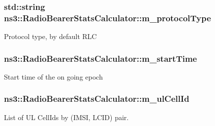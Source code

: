 \subsubsection[{\texorpdfstring{m\+\_\+protocol\+Type}{m_protocolType}}]{\setlength{\rightskip}{0pt plus 5cm}std\+::string ns3\+::\+Radio\+Bearer\+Stats\+Calculator\+::m\+\_\+protocol\+Type\hspace{0.3cm}{\ttfamily [private]}}\hypertarget{classns3_1_1RadioBearerStatsCalculator_a04e3362d2cfc3b03fa417696a45f58e3}{}\label{classns3_1_1RadioBearerStatsCalculator_a04e3362d2cfc3b03fa417696a45f58e3}
Protocol type, by default R\+LC 
\subsubsection[{\texorpdfstring{m\+\_\+start\+Time}{m_startTime}}]{ ns3\+::\+Radio\+Bearer\+Stats\+Calculator\+::m\+\_\+start\+Time\hspace{0.3cm}{\ttfamily [private]}}\hypertarget{classns3_1_1RadioBearerStatsCalculator_a421041c2860801f4b5f9aa55869755c6}{}\label{classns3_1_1RadioBearerStatsCalculator_a421041c2860801f4b5f9aa55869755c6}
Start time of the on going epoch 
\subsubsection[{\texorpdfstring{m\+\_\+ul\+Cell\+Id}{m_ulCellId}}]{ ns3\+::\+Radio\+Bearer\+Stats\+Calculator\+::m\+\_\+ul\+Cell\+Id\hspace{0.3cm}{\ttfamily [private]}}\hypertarget{classns3_1_1RadioBearerStatsCalculator_ada3352c06cc37fb640ae3106313d42f8}{}\label{classns3_1_1RadioBearerStatsCalculator_ada3352c06cc37fb640ae3106313d42f8}


List of UL Cell\+Ids by (I\+M\+SI, L\+C\+ID) pair. 

